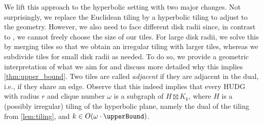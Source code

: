 %
We lift this approach to the hyperbolic setting with two major changes.
Not surprisingly, we replace the Euclidean tiling by a hyperbolic tiling to adjust to the geometry.
However, we also need to face different disk radii since, in contrast to \cite{dvorak_notes_2021}, we cannot freely choose the size of our tiles.
For large disk radii, we solve this by merging tiles so that we obtain an irregular tiling with larger tiles, whereas we subdivide tiles for small disk radii as needed.
%
To do so, we provide a geometric interpretation of what we aim for and discuss more detailed why this implies \cref{thm:upper_bound}.
Two tiles are called \emph{adjacent} if they are adjacent in the dual, i.e., if they share an edge.
%
%
\tiling*
%
Observe that this indeed implies that every HUDG with radius $ r $ and clique number $ \omega $ is a subgraph of $ H \boxtimes K_k $, where $ H $ is a (possibly irregular) tiling of the hyperbolic plane, namely the dual of the tiling from \cref{lem:tiling}, and $ k \in O(\omega \cdot \upperBound) $.
